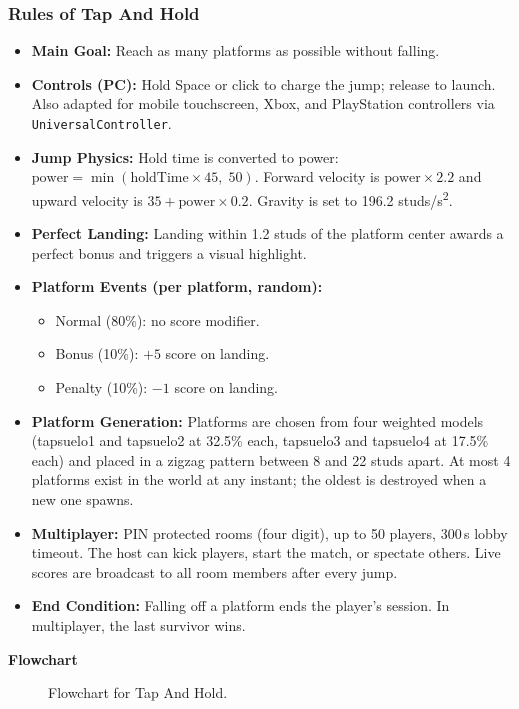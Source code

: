 \documentclass[12pt,letterpaper]{article}
\begin{document}
\subsubsection{Rules of Tap And Hold}
\begin{itemize}
  \item \textbf{Main Goal:} Reach as many platforms as possible without falling.
  \item \textbf{Controls (PC):} Hold Space or click to charge the jump; release to launch. Also adapted for mobile touchscreen, Xbox, and PlayStation controllers via \texttt{UniversalController}.
  \item \textbf{Jump Physics:} Hold time is converted to power: $\text{power} = \min(\text{holdTime} \times 45,\; 50)$. Forward velocity is $\text{power} \times 2.2$ and upward velocity is $35 + \text{power} \times 0.2$. Gravity is set to 196.2 studs/s\textsuperscript{2}.
  \item \textbf{Perfect Landing:} Landing within 1.2 studs of the platform center awards a perfect bonus and triggers a visual highlight.
  \item \textbf{Platform Events (per platform, random):}
  \begin{itemize}
    \item Normal (80\%): no score modifier.
    \item Bonus (10\%): $+5$ score on landing.
    \item Penalty (10\%): $-1$ score on landing.
  \end{itemize}
  \item \textbf{Platform Generation:} Platforms are chosen from four weighted models (tapsuelo1 and tapsuelo2 at 32.5\% each, tapsuelo3 and tapsuelo4 at 17.5\% each) and placed in a zigzag pattern between 8 and 22 studs apart. At most 4 platforms exist in the world at any instant; the oldest is destroyed when a new one spawns.
  \item \textbf{Multiplayer:} PIN protected rooms (four digit), up to 50 players, 300\,s lobby timeout. The host can kick players, start the match, or spectate others. Live scores are broadcast to all room members after every jump.
  \item \textbf{End Condition:} Falling off a platform ends the player's session. In multiplayer, the last survivor wins.
\end{itemize}

\textbf{Flowchart}
\begin{figure}[H]
  \centering
  
  \caption{Flowchart for Tap And Hold.}
  \label{fig:tapandhold_flow}
\end{figure}
\end{document}

